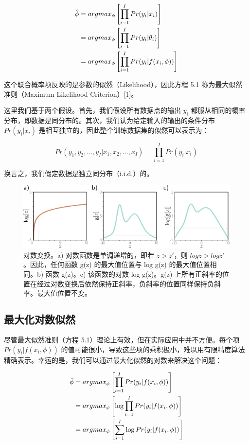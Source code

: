 \begin{align}
	\hat{\phi} &= argmax_{\phi} \left[ \prod_{i=1}^{I} Pr(y_i|x_i) \right] \notag \\
	&= argmax_{\phi} \left[ \prod_{i=1}^{I} Pr(y_i|\theta_i) \right] \notag \\
	&= argmax_{\phi} \left[ \prod_{i=1}^{I} Pr(y_i|f(x_i, \phi)) \right]  
\end{align} 


这个联合概率项反映的是参数的似然（Likelihood），因此方程 5.1 称为最大似然准则（Maximum Likelihood Criterion）[1]。

这里我们基于两个假设。首先，我们假设所有数据点的输出 \(y_i\) 都服从相同的概率分布，即数据是同分布的。其次，我们认为给定输入的输出的条件分布 \(Pr(y_i|x_i)\) 是相互独立的，因此整个训练数据集的似然可以表示为：

\begin{equation}
Pr(y_1, y_2, \ldots , y_I|x_1, x_2, \ldots , x_I) = \prod_{i=1}^{I} Pr(y_i|x_i) 
\end{equation}

换言之，我们假定数据是独立同分布（i.i.d.）的。

\begin{figure}[ht!]
	\centering
	\includegraphics[width=0.7\linewidth]{png/chapter5/LossLog.png}
	\caption{对数变换。a) 对数函数是单调递增的，即若 \(z > z \prime \)，则 \(log z > log z \prime\)。因此，任何函数 g(z) 的最大值位置与 log g(z) 的最大值位置相同。b) 函数 g(z)。c) 该函数的对数 log g(z)。g(z) 上所有正斜率的位置在经过对数变换后依然保持正斜率，负斜率的位置同样保持负斜率。最大值位置不变。}
\end{figure}

\subsection{最大化对数似然}
尽管最大似然准则（方程 5.1）理论上有效，但在实际应用中并不方便。每个项 \(Pr(y_i|f(x_i, \phi))\) 的值可能很小，导致这些项的乘积极小，难以用有限精度算法精确表示。幸运的是，我们可以通过最大化似然的对数来解决这个问题：


\begin{align}
	\hat{\phi} &= argmax_{\phi} \left[ \prod_{i=1}^{I} Pr(y_i|f(x_i, \phi)) \right] \notag \\
	&= argmax_{\phi} \left[ \log \prod_{i=1}^{I} Pr(y_i|f(x_i, \phi)) \right] \notag \\
	&= argmax_{\phi} \left[ \sum_{i=1}^{I} \log Pr(y_i|f(x_i, \phi)) \right] 
\end{align} 


